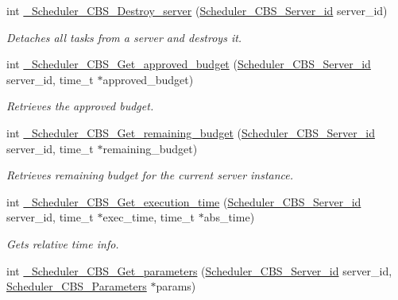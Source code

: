 \begin{DoxyCompactItemize}
int \mbox{\hyperlink{group__RTEMSScoreSchedulerCBS_gaa0492d484f48089e4418faa2ed3a83f9}{\+\_\+\+Scheduler\+\_\+\+C\+B\+S\+\_\+\+Destroy\+\_\+server}} (\mbox{\hyperlink{group__RTEMSScoreSchedulerCBS_gaec8b0a87aaeee5befd176ed946ad60a7}{Scheduler\+\_\+\+C\+B\+S\+\_\+\+Server\+\_\+id}} server\+\_\+id)
\begin{DoxyCompactList}\small\item\em Detaches all tasks from a server and destroys it. \end{DoxyCompactList}\item 
int \mbox{\hyperlink{group__RTEMSScoreSchedulerCBS_ga9e02096eb010c0141c4c66c27f338aba}{\+\_\+\+Scheduler\+\_\+\+C\+B\+S\+\_\+\+Get\+\_\+approved\+\_\+budget}} (\mbox{\hyperlink{group__RTEMSScoreSchedulerCBS_gaec8b0a87aaeee5befd176ed946ad60a7}{Scheduler\+\_\+\+C\+B\+S\+\_\+\+Server\+\_\+id}} server\+\_\+id, time\+\_\+t $\ast$approved\+\_\+budget)
\begin{DoxyCompactList}\small\item\em Retrieves the approved budget. \end{DoxyCompactList}\item 
int \mbox{\hyperlink{group__RTEMSScoreSchedulerCBS_ga881bfce00d607ef1ec895fa5e73043af}{\+\_\+\+Scheduler\+\_\+\+C\+B\+S\+\_\+\+Get\+\_\+remaining\+\_\+budget}} (\mbox{\hyperlink{group__RTEMSScoreSchedulerCBS_gaec8b0a87aaeee5befd176ed946ad60a7}{Scheduler\+\_\+\+C\+B\+S\+\_\+\+Server\+\_\+id}} server\+\_\+id, time\+\_\+t $\ast$remaining\+\_\+budget)
\begin{DoxyCompactList}\small\item\em Retrieves remaining budget for the current server instance. \end{DoxyCompactList}\item 
int \mbox{\hyperlink{group__RTEMSScoreSchedulerCBS_gaab8e7331d587e5fbae175acd70fe962e}{\+\_\+\+Scheduler\+\_\+\+C\+B\+S\+\_\+\+Get\+\_\+execution\+\_\+time}} (\mbox{\hyperlink{group__RTEMSScoreSchedulerCBS_gaec8b0a87aaeee5befd176ed946ad60a7}{Scheduler\+\_\+\+C\+B\+S\+\_\+\+Server\+\_\+id}} server\+\_\+id, time\+\_\+t $\ast$exec\+\_\+time, time\+\_\+t $\ast$abs\+\_\+time)
\begin{DoxyCompactList}\small\item\em Gets relative time info. \end{DoxyCompactList}\item 
int \mbox{\hyperlink{group__RTEMSScoreSchedulerCBS_gae4acd9e160c2a357b9256ee604de0d6f}{\+\_\+\+Scheduler\+\_\+\+C\+B\+S\+\_\+\+Get\+\_\+parameters}} (\mbox{\hyperlink{group__RTEMSScoreSchedulerCBS_gaec8b0a87aaeee5befd176ed946ad60a7}{Scheduler\+\_\+\+C\+B\+S\+\_\+\+Server\+\_\+id}} server\+\_\+id, \mbox{\hyperlink{structScheduler__CBS__Parameters}{Scheduler\+\_\+\+C\+B\+S\+\_\+\+Parameters}} $\ast$params)

\end{DoxyCompactItemize}
